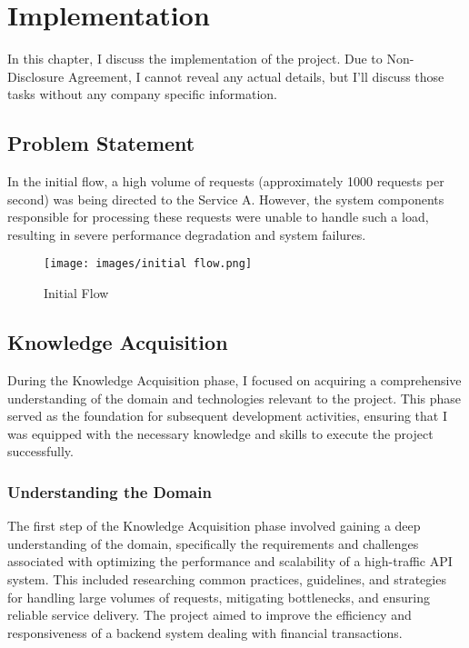 \documentclass[12pt,a4paper]{report}
\begin{document}
\chapter{Implementation}

In this chapter, I discuss the implementation of the project. Due to Non-Disclosure Agreement, I cannot reveal any actual details, but I’ll discuss those tasks without any company specific information.


\section{Problem Statement}

In the initial flow, a high volume of requests (approximately 1000 requests per second) was being directed to the Service A. However, the system components responsible for processing these requests were unable to handle such a load, resulting in severe performance degradation and system failures.

\begin{figure}[h]
  \centering
  \texttt{[image: images/initial flow.png]}\\[1.5cm]
  \caption{Initial Flow}
  \label{fig:example}
\end{figure}



\section{Knowledge Acquisition}

During the Knowledge Acquisition phase, I focused on acquiring a comprehensive understanding of the domain and technologies relevant to the project. This phase served as the foundation for subsequent development activities, ensuring that I was equipped with the necessary knowledge and skills to execute the project successfully.

\subsection{Understanding the Domain}

The first step of the Knowledge Acquisition phase involved gaining a deep understanding of the domain, specifically the requirements and challenges associated with optimizing the performance and scalability of a high-traffic API system. This included researching common practices, guidelines, and strategies for handling large volumes of requests, mitigating bottlenecks, and ensuring reliable service delivery. The project aimed to improve the efficiency and responsiveness of a backend system dealing with financial transactions.
\end{document}
